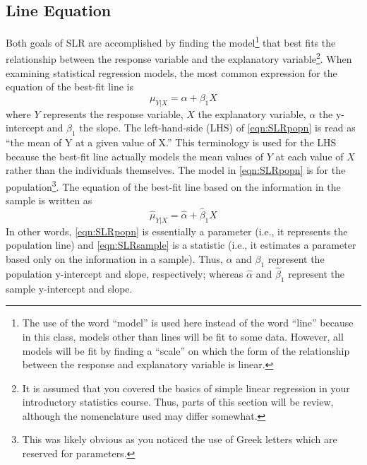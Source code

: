 \documentclass[10pt,openany]{book}\usepackage[]{graphicx}\usepackage[]{color}
\begin{document}

\vspace{-12pt}

\subsection{Line Equation}
Both goals of SLR are accomplished by finding the model\footnote{The use of the word ``model'' is used here instead of the word ``line'' because in this class, models other than lines will be fit to some data.  However, all models will be fit by finding a ``scale'' on which the form of the relationship between the response and explanatory variable is linear.} that best fits the relationship between the response variable and the explanatory variable\footnote{It is assumed that you covered the basics of simple linear regression in your introductory statistics course.  Thus, parts of this section will be review, although the nomenclature used may differ somewhat.}.  When examining statistical regression models, the most common expression for the equation of the best-fit line is
\begin{equation}\label{eqn:SLRpopn}
  \mu_{Y|X} = \alpha + \beta_{1}X
\end{equation}
where $Y$ represents the response variable, $X$ the explanatory variable, $\alpha$ the y-intercept and $\beta_{1}$ the slope.  The left-hand-side (LHS) of \eqref{eqn:SLRpopn} is read as ``the mean of Y at a given value of X.''   This terminology is used for the LHS because the best-fit line actually models the mean values of $Y$ at each value of $X$ rather than the individuals themselves.  The model in \eqref{eqn:SLRpopn} is for the population\footnote{This was likely obvious as you noticed the use of Greek letters which are reserved for parameters.}.  The equation of the best-fit line based on the information in the sample is written as
\begin{equation}\label{eqn:SLRsample}
  \hat{\mu}_{Y|X} = \hat{\alpha} + \hat{\beta}_{1}X
\end{equation}
In other words, \eqref{eqn:SLRpopn} is essentially a parameter (i.e., it represents the population line) and \eqref{eqn:SLRsample} is a statistic (i.e., it estimates a parameter based only on the information in a sample).  Thus,  $\alpha$ and $\beta_{1}$ represent the population y-intercept and slope, respectively; whereas $\hat{\alpha}$ and $\hat{\beta}_{1}$ represent the sample y-intercept and slope.
\end{document}
